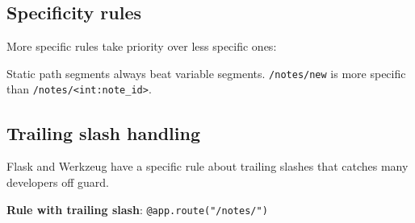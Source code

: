 \subsection*{Specificity rules}\label{32-routing:specificity-rules}

More specific rules take priority over less specific ones:

\begin{codebox}[short]

\begin{Shaded}
\begin{Highlighting}[]
\NormalTok{(}\NormalTok{)}

\NormalTok{(}\NormalTok{)          }


\end{Highlighting}
\end{Shaded}

\end{codebox}

\noindent{}Static path segments always beat variable segments. \texttt{/notes/new} is more specific than \texttt{/}\allowbreak{}\texttt{notes/}\allowbreak{}\texttt{\textless{}int:note\_id\textgreater{}}.

\subsection*{Trailing slash handling}\label{32-routing:trailing-slash-handling}

Flask and Werkzeug have a specific rule about trailing slashes that catches many developers off guard.

\textbf{Rule with trailing slash}: \texttt{@app.route("/}\allowbreak{}\texttt{notes/}\allowbreak{}\texttt{")}


